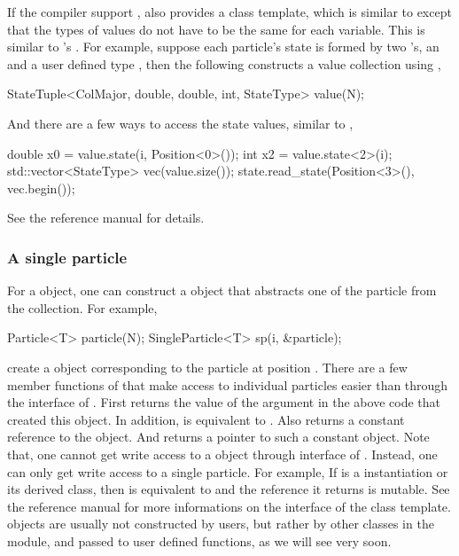 \documentclass[11pt, fontset=Minion, showoverfull,
bib, biblatexstyle=numeric, mintcode, minted=cache]{marticle}
\begin{document}
If the compiler support \cppoo{} , \vsmc also provides a
 class template, which is similar to
 except that the types of values do not have to be the
same for each variable.  This is similar to \crlang's .
For example, suppose each particle's state is formed by two
's, an  and a user defined type
, then the following constructs a value collection using
,
\begin{cppcode}
StateTuple<ColMajor, double, double, int, StateType> value(N);
\end{cppcode}
And there are a few ways to access the state values, similar to
,
\begin{cppcode}
double x0 = value.state(i, Position<0>());
int x2 = value.state<2>(i);
std::vector<StateType> vec(value.size());
state.read_state(Position<3>(), vec.begin());
\end{cppcode}
See the reference manual for details.

\subsubsection{A single particle}

For a  object, one can construct a
 object that abstracts one of the particle from
the collection. For example,
\begin{cppcode}
Particle<T> particle(N);
SingleParticle<T> sp(i, &particle);
\end{cppcode}
create a  object corresponding to the particle at
position . There are a few member functions of
 that make access to individual particles easier
than through the interface of . First
 returns the value of the argument  in the
above code that created this  object. In
addition,  is equivalent to .
Also  returns a constant reference to the
 object. And  returns a
pointer to such a constant  object. Note that, one
cannot get write access to a  object through interface
of . Instead, one can only get write access to a
single particle. For example, If  is a 
instantiation or its derived class, then  is
equivalent to  and the reference it
returns is mutable.  See the reference manual for more informations on the
interface of the  class template.
 objects are usually not constructed by users,
but rather by other classes in the \smp module, and passed to user defined
functions, as we will see very soon.
\end{document}

